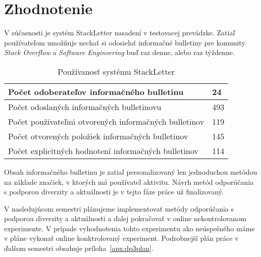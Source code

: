 \newpage

\chapter{Zhodnotenie}

V súčasnosti je systém StackLetter nasadení v testovacej prevádzke. Zatiaľ používateľom umožňuje nechať si odosielať
informačné bulletiny pre komunity \textit{Stack Overflow} a \textit{Software Engineering} buď raz denne, alebo raz týždenne.

\begin{table}[h]
\centering
\caption{Používanosť systému StackLetter}
\begin{tabular}{|m{10cm}|m{1.5cm}|}
\hline
Počet odoberateľov informačného bulletinu & 24 \\ \hline
Počet odoslaných informačných bulletinovu & 493 \\ \hline
Počet používateľmi otvorených informačných bulletinov & 119\footnotemark \\ \hline
Počet otvorených položiek informačných bulletinov & 145 \\ \hline
Počet explicitných hodnotení informačných bulletinov & 114 \\ \hline
\end{tabular}
\end{table}


Obsah informačného bulletinu je zatiaľ personalizovaný len jednoduchou metódou na základe značiek, v ktorých má používateľ aktivitu.
Návrh metód odporúčania s podporou diverzity a aktuálnosti je v tejto fáze práce už finalizovaný.

V nasledujúcom semestri plánujeme implementovať metódy odporúčania s podporou diverzity a aktuálnosti a ďalej pokračovať
v online nekontrolovanom experimente. V prípade vyhodnotenia tohto experimentu ako neúspešného máme v pláne vykonať
online konktrolovaný experiment. Podrobnejší plán práce v ďalšom semestri obsahuje príloha~\ref{apx:dp3plan}.
